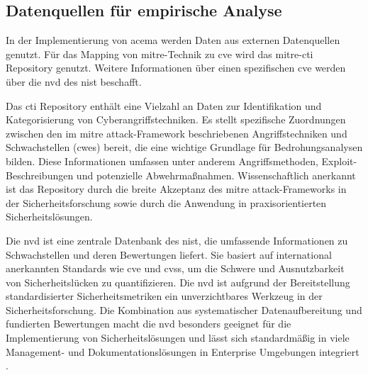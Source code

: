 \subsection{Datenquellen für empirische Analyse}
\par In der Implementierung von \gls{acema} werden Daten aus externen Datenquellen genutzt. Für das Mapping von \gls{mitre}-Technik zu \gls{cve} wird das \gls{mitre}-\gls{cti} Repository genutzt. Weitere Informationen über einen spezifischen \gls{cve} werden über die \gls{nvd} des \gls{nist} beschafft.
\par Das \gls{cti} Repository enthält eine Vielzahl an Daten zur Identifikation und Kategorisierung von Cyberangriffstechniken. Es stellt spezifische Zuordnungen zwischen den im \gls{mitre} \gls{attack}-Framework beschriebenen Angriffstechniken und Schwachstellen (\glspl{cwe}) bereit, die eine wichtige Grundlage für Bedrohungsanalysen bilden. Diese Informationen umfassen unter anderem Angriffsmethoden, Exploit-Beschreibungen und potenzielle Abwehrmaßnahmen. Wissenschaftlich anerkannt ist das Repository durch die breite Akzeptanz des \gls{mitre} \gls{attack}-Frameworks in der Sicherheitsforschung sowie durch die Anwendung in praxisorientierten Sicherheitslösungen.
\par Die \gls{nvd} ist eine zentrale Datenbank des \gls{nist}, die umfassende Informationen zu Schwachstellen und deren Bewertungen liefert. Sie basiert auf international anerkannten Standards wie \gls{cve} und \gls{cvss}, um die Schwere und Ausnutzbarkeit von Sicherheitslücken zu quantifizieren. Die \gls{nvd} ist aufgrund der Bereitstellung standardisierter Sicherheitsmetriken ein unverzichtbares Werkzeug in der Sicherheitsforschung. Die Kombination aus systematischer Datenaufbereitung und fundierten Bewertungen macht die \gls{nvd} besonders geeignet für die Implementierung von Sicherheitslösungen und lässt sich standardmäßig in viele Management- und Dokumentationslösungen in Enterprise Umgebungen integriert \autocite{AssetsNVDIntegration,InformationenNVDIntegrationen}.